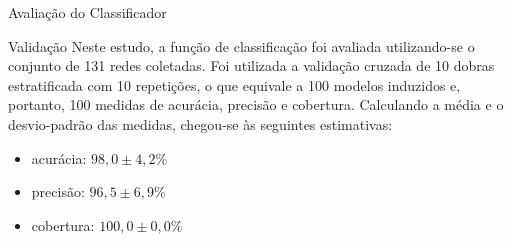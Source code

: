 \begin{section}{Avaliação do Classificador}
\begin{subsection}{Validação}
		Neste estudo, a função de classificação foi avaliada utilizando-se o conjunto de 131 redes coletadas. Foi utilizada a validação cruzada de 10 dobras estratificada com 10 repetições, o que equivale a 100 modelos induzidos e, portanto, 100 medidas de acurácia, precisão e cobertura. Calculando a média e o desvio-padrão das medidas, chegou-se às seguintes estimativas:




% 


		\begin{itemize}
			\item acurácia:  $98,0 \pm 4,2\%$
			\item precisão:  $96,5 \pm 6,9\%$
			\item cobertura: $100,0 \pm 0,0\%$
		\end{itemize}


\end{subsection}
\end{section}
